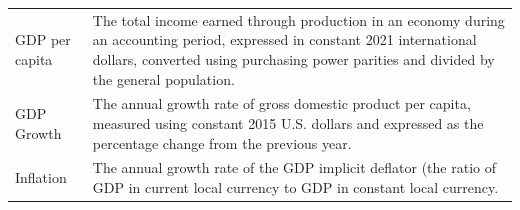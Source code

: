 \begin{table}[!h]
\begin{tabular}[t]{>{\raggedright\arraybackslash}p{3cm}>{\raggedright\arraybackslash}p{12cm}}
GDP per capita & The total income earned through production in an economy during an
    accounting period, expressed in constant 2021 international dollars,
    converted using purchasing power parities and divided by the
    general population.\\
\addlinespace[1.2ex]
GDP Growth & The annual growth rate of gross domestic product per capita, measured using
    constant 2015 U.S. dollars and expressed as the percentage change from the
    previous year.\\
\addlinespace[1.2ex]
Inflation & The annual growth rate of the GDP implicit deflator (the ratio of GDP in
    current local currency to GDP in constant local currency.\\
\bottomrule
\end{tabular}
\end{table}